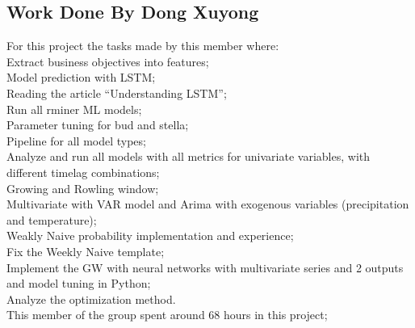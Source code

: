 \newpage

\subsection{Work Done By Dong Xuyong}

\quad For this project the tasks made by this member where:\\

\quad \textbullet Extract business objectives into features;\\

\quad \textbullet Model prediction with LSTM;\\

\quad \textbullet Reading the article “Understanding LSTM”;\\

\quad \textbullet Run all rminer ML models;\\

\quad \textbullet Parameter tuning for bud and stella;\\

\quad \textbullet Pipeline for all model types;\\

\quad \textbullet Analyze and run all models with all metrics for univariate variables, with different timelag combinations;\\

\quad \textbullet Growing and Rowling window;\\

\quad \textbullet Multivariate with VAR model and Arima with exogenous variables (precipitation and temperature);\\

\quad \textbullet Weakly Naive probability implementation and experience;\\

\quad \textbullet Fix the Weekly Naive template;\\

\quad \textbullet Implement the GW with neural networks with multivariate series and 2 outputs and model tuning in Python;\\

\quad \textbullet Analyze the optimization method.\\

This member of the group spent around 68 hours in this project;